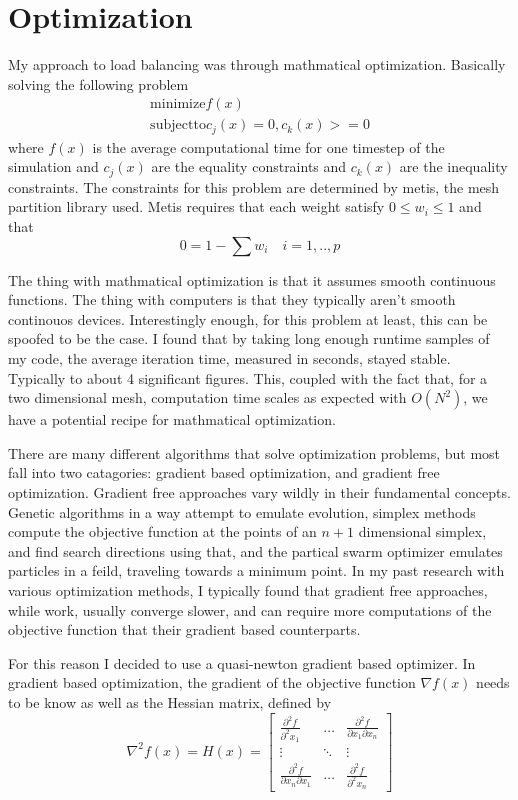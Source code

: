\documentclass[12pt,parskip=full]{article}
\numberwithin{subsection}{section}
\begin{document}
	\section{Optimization}
		My approach to load balancing was through mathmatical optimization. Basically solving the following problem
		\begin{eqnarray}
			\mathrm{minimize} f(x) \\
			\mathrm{subject to} c_j(x) = 0, c_k(x) >= 0
		\end{eqnarray}
		where $f(x)$ is the average computational time for one timestep of the simulation and $c_j(x)$ are the equality constraints and 
		$c_k(x)$ are the inequality constraints. The constraints for this problem are determined by metis, the mesh partition library used.
		Metis requires that each weight satisfy $0 \le w_i \le 1$ and that
		\begin{equation}
			0 = 1 - \sum{w_i} \quad i = 1,..,p
		\end{equation}
		
		The thing with mathmatical optimization is that it assumes smooth continuous functions. The thing with computers is that they
		typically aren't smooth continouos devices. Interestingly enough, for this problem at least, this can be spoofed to be the case.
		I found that by taking long enough runtime samples of my code, the average iteration time, measured in seconds, stayed stable.
		Typically to about 4 significant figures. This, coupled with the fact that, for a two dimensional mesh, computation time scales
		as expected with $O(N^2)$, we have a potential recipe for mathmatical optimization. 

		There are many different algorithms that solve optimization problems, but most fall into two catagories: gradient based optimization,
		and gradient free optimization. Gradient free approaches vary wildly in their fundamental concepts. Genetic algorithms in a way
		attempt to emulate evolution, simplex methods compute the objective function at the points of an $n + 1$ dimensional simplex, and
		find search directions using that, and the partical swarm optimizer emulates particles in a feild, traveling towards a minimum point.
		In my past research with various optimization methods, I typically found that gradient free approaches, while work, usually converge
		slower, and can require more computations of the objective function that their gradient based counterparts.

		For this reason I decided to use a quasi-newton gradient based optimizer. In gradient based optimization, the gradient of the objective
		function $\nabla f(x)$ needs to be know as well as the Hessian matrix, defined by
		\begin{equation}
			\nabla^2 f(x) = H(x) = \begin{bmatrix}
				\frac{\partial^2 f}{\partial^2 x_1} & \dots & \frac{\partial^2 f}{\partial x_1 \partial x_n} \\
				\vdots & \ddots & \vdots \\
				\frac{\partial^2 f}{\partial x_n \partial x_1} & \dots & \frac{\partial^2 f}{\partial^2 x_n}
			\end{bmatrix}
		\end{equation}
\end{document}
